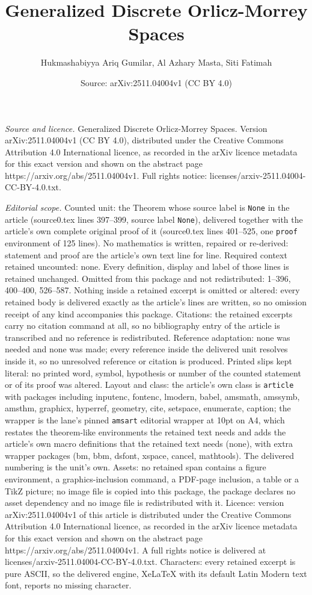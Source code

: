\documentclass[10pt,a4paper]{amsart}
\title[Generalized Discrete Orlicz-Morrey Spaces]{Generalized Discrete Orlicz-Morrey Spaces}
\author{Hukmashabiyya Ariq Gumilar, Al Azhary Masta, Siti Fatimah}
\date{Source: arXiv:2511.04004v1 (CC BY 4.0)}
\begin{document}
\maketitle

\noindent\emph{Source and licence.} Generalized Discrete Orlicz-Morrey Spaces. Version arXiv:2511.04004v1 (CC BY 4.0), distributed under the Creative Commons Attribution 4.0 International licence, as recorded in the arXiv licence metadata for this exact version and shown on the abstract page https://arxiv.org/abs/2511.04004v1. Full rights notice: licenses/arxiv-2511.04004-CC-BY-4.0.txt.\par\smallskip

\noindent\textit{Editorial scope.} Counted unit: the Theorem whose source label is \texttt{None} in the article (source0.tex lines 397--399, source label \texttt{None}), delivered together with the article's own complete original proof of it (source0.tex lines 401--525, one \texttt{proof} environment of 125 lines). No mathematics is written, repaired or re-derived: statement and proof are the article's own text line for line. Required context retained uncounted: none. Every definition, display and label of those lines is retained unchanged. Omitted from this package and not redistributed: 1--396, 400--400, 526--587. Nothing inside a retained excerpt is omitted or altered: every retained body is delivered exactly as the article's lines are written, so no omission receipt of any kind accompanies this package. Citations: the retained excerpts carry no citation command at all, so no bibliography entry of the article is transcribed and no reference is redistributed. Reference adaptation: none was needed and none was made; every reference inside the delivered unit resolves inside it, so no unresolved reference or citation is produced. Printed slips kept literal: no printed word, symbol, hypothesis or number of the counted statement or of its proof was altered. Layout and class: the article's own class is \texttt{article} with packages including inputenc, fontenc, lmodern, babel, amsmath, amssymb, amsthm, graphicx, hyperref, geometry, cite, setspace, enumerate, caption; the wrapper is the lane's pinned \texttt{amsart} editorial wrapper at 10pt on A4, which restates the theorem-like environments the retained text needs and adds the article's own macro definitions that the retained text needs (none), with extra wrapper packages (bm, bbm, dsfont, xspace, cancel, mathtools). The delivered numbering is the unit's own. Assets: no retained span contains a figure environment, a graphics-inclusion command, a PDF-page inclusion, a table or a TikZ picture; no image file is copied into this package, the package declares no asset dependency and no image file is redistributed with it. Licence: version arXiv:2511.04004v1 of this article is distributed under the Creative Commons Attribution 4.0 International licence, as recorded in the arXiv licence metadata for this exact version and shown on the abstract page https://arxiv.org/abs/2511.04004v1. A full rights notice is delivered at licenses/arxiv-2511.04004-CC-BY-4.0.txt. Characters: every retained excerpt is pure ASCII, so the delivered engine, XeLaTeX with its default Latin Modern text font, reports no missing character.
\end{document}
